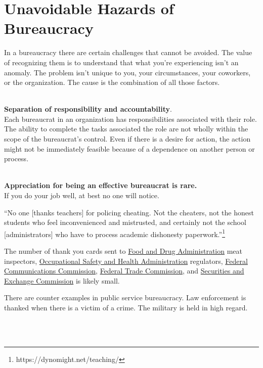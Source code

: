 \section{Unavoidable Hazards of Bureaucracy\label{sec:unavoidable_hazards}}

In a bureaucracy there are certain challenges that cannot be avoided. The value of recognizing them is to understand that what you're experiencing isn't an anomaly. The problem isn't unique to you, your circumstances, your coworkers, or the organization. The cause is the combination of all those factors.

\ \\

\textbf{Separation of responsibility and accountability}. \\
Each bureaucrat in an organization has responsibilities associated with their role. The ability to complete the tasks associated the role are not wholly within the scope of the bureaucrat's control. Even if there is a desire for action, the action might not be immediately feasible because of a dependence on another person or process. 

\ \\

\textbf{Appreciation for being an effective bureaucrat is rare.}\\
If you do your job well, at best no one will notice.

``No one [thanks teachers] for policing cheating. Not the cheaters, not the honest students who feel inconvenienced and mistrusted, and certainly not the school [administrators] who have to process academic dishonesty paperwork.''\footnote{https://dynomight.net/teaching/}

The number of thank you cards sent to \href{https://www.fda.gov/}{Food and Drug Administration} meat inspectors, \href{https://www.osha.gov/}{Occupational Safety and Health Administration} regulators, \href{https://www.fcc.gov/}{Federal Communications Commission}, \href{https://www.ftc.gov/}{Federal Trade Commission}, and \href{https://www.sec.gov/}{Securities and Exchange Commission} is likely small. 

There are counter examples in public service bureaucracy. 
Law enforcement is thanked when there is a victim of a crime. The military is held in high regard. 

\ \\


\ \\


